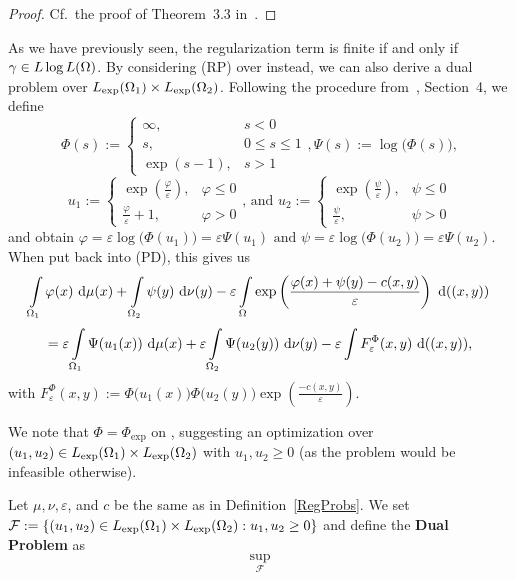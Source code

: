 \begin{proof}
	Cf.~the proof of Theorem~3.3 in~\cite{Cla2021}.
\end{proof}

As we have previously seen, the regularization term is finite if and only if $\gamma \in \LLL$. By considering (RP) over \LLL{} instead, we can also derive a dual problem over $\Lexp[\Omega_1] \times \Lexp[\Omega_2]$. Following the procedure from~\cite{Cla2021}, Section~4, we define
\[ \Phi(s) := \begin{cases}
	\infty, & s < 0 \\
	s, & 0 \le s \le 1 \\
	\exp(s - 1), & s > 1
\end{cases}, \Psi(s) := \log \big( \Phi(s) \big), \]
\[ u_1 := \begin{cases}
	\exp \left( \frac{\varphi}{\varepsilon} \right), & \varphi \le 0 \\
	\frac{\varphi}{\varepsilon} + 1, & \varphi > 0
\end{cases} \text{, and } u_2 := \begin{cases}
	\exp \left( \frac{\psi}{\varepsilon} \right), & \psi \le 0 \\
	\frac{\psi}{\varepsilon}, & \psi > 0
\end{cases} \]
and obtain $\varphi = \varepsilon \log \big( \Phi(u_1) \big) = \varepsilon \Psi(u_1) \text{ and } \psi = \varepsilon \log \big( \Phi(u_2) \big) = \varepsilon \Psi(u_2)$. When put back into (PD), this gives us
\[ \int\limits_{\Omega_1} \varphi(x)~\Dx{\mu} + \int\limits_{\Omega_2} \psi(y)~\Dx[y]{\nu} - \varepsilon \int\limits_{\Omega} \exp \left( \frac{\varphi(x) + \psi(y) - c(x, y)}{\varepsilon} \right)~\Dx[(x, y)]{} \]
\[ = \varepsilon \int\limits_{\Omega_1} \Psi(u_1(x))~\Dx{\mu} + \varepsilon \int\limits_{\Omega_2} \Psi(u_2(y))~\Dx[y]{\nu} - \varepsilon \int\limits F_{\varepsilon}^{\Phi}(x, y)~\Dx[(x, y)]{}, \]
with $F_{\varepsilon}^{\Phi}(x, y) := \Phi\big( u_1(x) \big) \Phi\big( u_2(y) \big) \exp\left( \frac{-c(x, y)}{\varepsilon} \right)$.

We note that $\Phi = \Phi_{\exp}$ on \RZero, suggesting an optimization over ${(u_1, u_2)} \in \Lexp[\Omega_1] \times \Lexp[\Omega_2]$ with $u_1, u_2 \ge 0$ (as the problem would be infeasible otherwise).

\begin{definition}\label{RegDualProb}
	Let $\mu, \nu, \varepsilon$, and $c$ be the same as in Definition~\ref{RegProbs}. We set $\mathcal{F} := \{ (u_1, u_2) \in \Lexp[\Omega_1] \times \Lexp[\Omega_2] : u_1, u_2 \ge 0 \}$ and define the \textbf{Dual Problem} as
	\[ \sup\limits_{\mathcal{F}} \]
\end{definition}

